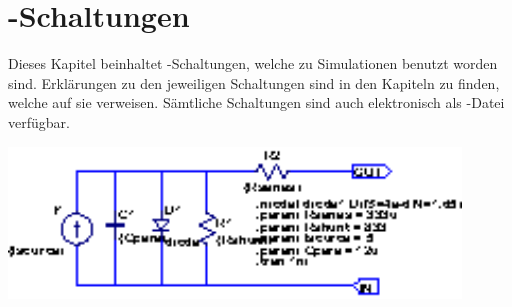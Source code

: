 \chapter{-Schaltungen}
\label{app:ltspice}

Dieses Kapitel  beinhaltet -Schaltungen, welche  zu Simulationen
benutzt worden sind. Erkl\"arungen  zu den jeweiligen Schaltungen  sind in den
Kapiteln  zu finden,  welche auf  sie verweisen. S\"amtliche  Schaltungen sind
auch elektronisch als -Datei verf\"ugbar.

\noindent\begin{minipage}{\textwidth}
    \centering
    \includegraphics[width=0.9\textwidth]{images/ltspice/singlecell.eps}
    \label{fig:ltspice:solarCell}
\end{minipage}


